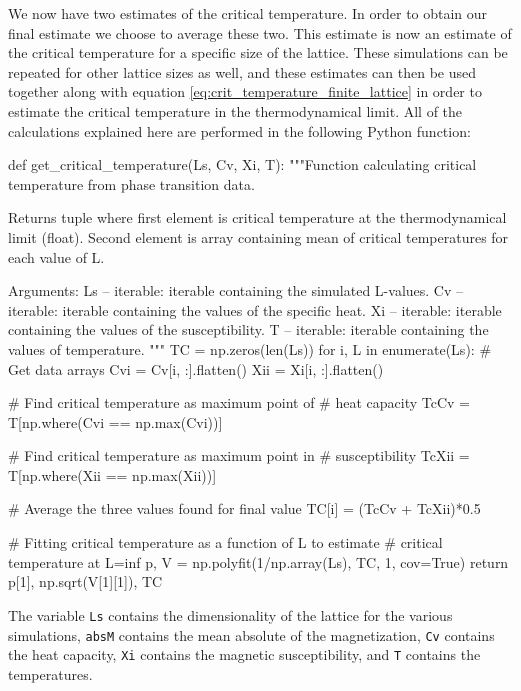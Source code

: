 \documentclass[reprint,english,notitlepage]{revtex4-1}  %
\begin{document}
We now have two estimates of the critical temperature. In order to obtain our final estimate we choose to average these two. This estimate is now an estimate of the critical temperature for a specific size of the lattice. These simulations can be repeated for other lattice sizes as well, and these estimates can then be used together along with equation \eqref{eq:crit_temperature_finite_lattice} in order to estimate the critical temperature in the thermodynamical limit. All of the calculations explained here are performed in the following Python function:

\begin{python}
def get_critical_temperature(Ls, Cv, Xi, T):
    """Function calculating critical temperature from phase
    transition data.

    Returns tuple where first element is critical temperature at
    the thermodynamical limit (float). Second element is array
    containing mean of critical temperatures for each value of L.

    Arguments:
    Ls -- iterable: iterable containing the simulated L-values.
    Cv -- iterable: iterable containing the values of the specific
    				heat.
    Xi -- iterable: iterable containing the values of the
    				susceptibility.
    T -- iterable: iterable containing the values of
    			   temperature.
    """
    TC = np.zeros(len(Ls))
    for i, L in enumerate(Ls):
        # Get data arrays
        Cvi = Cv[i, :].flatten()
        Xii = Xi[i, :].flatten()

        # Find critical temperature as maximum point of
        # heat capacity
        TcCv = T[np.where(Cvi == np.max(Cvi))]

        # Find critical temperature as maximum point in
        # susceptibility
        TcXii = T[np.where(Xii == np.max(Xii))]

        # Average the three values found for final value
        TC[i] = (TcCv + TcXii)*0.5

    # Fitting critical temperature as a function of L to estimate
    # critical temperature at L=inf
    p, V = np.polyfit(1/np.array(Ls), TC, 1, cov=True)
    return p[1], np.sqrt(V[1][1]), TC
\end{python} 

The variable \verb+Ls+ contains the dimensionality of the lattice for the various simulations, \verb+absM+ contains the mean absolute of the magnetization, \verb+Cv+ contains the heat capacity, \verb+Xi+ contains the magnetic susceptibility, and \verb+T+ contains the temperatures. 
\end{document}
